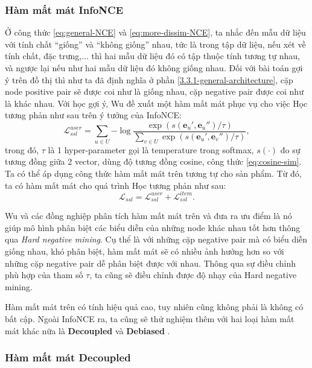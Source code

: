 \subsubsection{Hàm mất mát InfoNCE}
\noindent Ở công thức \eqref{eq:general-NCE} và \eqref{eq:more-dissim-NCE}, ta nhắc đến mẫu dữ liệu với tính chất ``giống'' và ``không giống'' nhau, tức là trong tập dữ liệu, nếu xét về tính chất, đặc trưng,... thì hai mẫu dữ liệu đó có tập thuộc tính tương tự nhau, và ngược lại nếu như hai mẫu dữ liệu đó không giống nhau. Đối với bài toán gợi ý trên đồ thị thì như ta đã định nghĩa ở phần \ref{3.3.1-general-architecture}, cặp node positive pair sẽ được coi như là giống nhau, cặp negative pair được coi như là khác nhau. Với học gợi ý, Wu \cite{SGL} đề xuất một hàm mất mát phục vụ cho việc Học tương phản như sau trên ý tưởng của InfoNCE:
\begin{equation}
    \mathcal{L}_\textit{ssl}^\textit{user} = \sum_{u \in U}{-\log{\frac{\exp(s(\mathbf{e}_u', \mathbf{e}_u'') / \tau)}{\sum_{v \in U}{\exp(s(\mathbf{e}_u', \mathbf{e}_v'') / \tau)}}}},
\end{equation}
trong đó, $\tau$ là 1 hyper-parameter gọi là temperature trong softmax, $s(\cdot)$ đo sự tương đồng giữa 2 vector, dùng độ tương đồng cosine, công thức \eqref{eq:cosine-sim}. Ta có thể áp dụng công thức hàm mất mát trên tương tự cho sản phẩm. Từ đó, ta có hàm mất mát cho quá trình Học tương phản như sau:
\begin{equation}
    \mathcal{L}_\textit{ssl} = \mathcal{L}_\textit{ssl}^\textit{user} + \mathcal{L}_\textit{ssl}^\textit{item}.
\end{equation}

Wu và các đồng nghiệp \cite{SGL} phân tích hàm mất mát trên và đưa ra ưu điểm là nó giúp mô hình phân biệt các biểu diễn của những node khác nhau tốt hơn thông qua \textit{Hard negative mining}. Cụ thể là với những cặp negative pair mà có biểu diễn giống nhau, khó phân biệt, hàm mất mát sẽ có nhiều ảnh hưởng hơn so với những cặp negative pair dễ phân biệt được với nhau. Thông qua sự điều chỉnh phù hợp của tham số $\tau$, ta cũng sẽ điều chỉnh được độ nhạy của Hard negative mining.

Hàm mất mát trên có tính hiệu quả cao, tuy nhiên cũng không phải là không có bất cập. Ngoài InfoNCE ra, ta cũng sẽ thử nghiệm thêm với hai loại hàm mất mát khác nữa là \textbf{Decoupled} \cite{decoupled-loss} và \textbf{Debiased} \cite{debiased-loss}.

\subsubsection{Hàm mất mát Decoupled}

